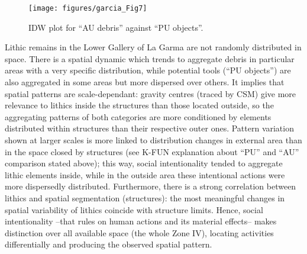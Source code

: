 \begin{figure}
	\texttt{[image: figures/garcia\_Fig7]}
	\centering
	\caption{IDW plot for “AU debris” against “PU objects”.}
	\label{fig:Garcia_Fig7}
\end{figure}

Lithic remains in the Lower Gallery of La Garma are not randomly distributed in space. There is a spatial dynamic which trends to aggregate debris in particular areas with a very specific distribution, while potential tools (“PU objects”) are also aggregated in some areas but more dispersed over others. It implies that spatial patterns are scale-dependant: gravity centres (traced by CSM) give more relevance to lithics inside the structures than those located outside, so the aggregating patterns of both categories are more conditioned by elements distributed within structures than their respective outer ones. Pattern variation shown at larger scales is more linked to distribution changes in external area than in the space closed by structures (see K-FUN explanation about “PU” and “AU” comparison stated above); this way, social intentionality tended to aggregate lithic elements inside, while in the outside area these intentional actions were more dispersedly distributed. Furthermore, there is a strong correlation between lithics and spatial segmentation (structures): the most meaningful changes in spatial variability of lithics coincide with structure limits. Hence, social intentionality –that rules on human actions and its material effects– makes distinction over all available space (the whole Zone IV), locating activities differentially and producing the observed spatial pattern.

